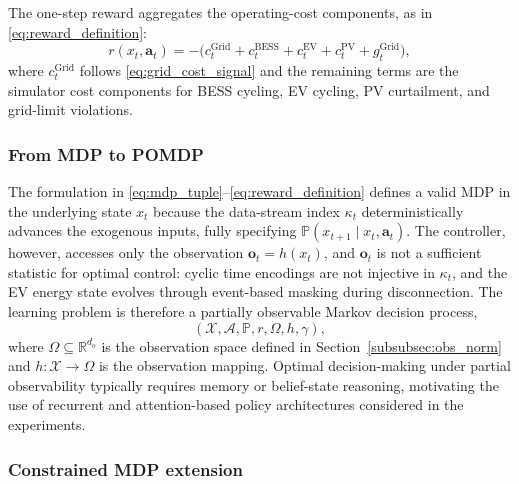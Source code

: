 \documentclass[preprint,12pt, 3p]{elsarticle}
\begin{document}
The one-step reward aggregates the operating-cost components, as in \eqref{eq:reward_definition}:
\begin{equation}
\label{eq:reward_definition}
r(x_t,\mathbf{a}_t)=
-\Big(
c^{\text{Grid}}_t
+c^{\text{BESS}}_t
+c^{\text{EV}}_t
+c^{\text{PV}}_t
+g^{\text{Grid}}_t
\Big),
\end{equation}
where $c^{\text{Grid}}_t$ follows \eqref{eq:grid_cost_signal} and the remaining terms are the simulator cost components for \gls{BESS} cycling, \gls{EV} cycling, \gls{PV} curtailment, and grid-limit violations.

\subsubsection{From MDP to POMDP}
\label{subsubsec:pomdp}

The formulation in \eqref{eq:mdp_tuple}--\eqref{eq:reward_definition} defines a valid \gls{MDP} in the underlying state $x_t$ because the data-stream index $\kappa_t$ deterministically advances the exogenous inputs, fully specifying $\mathbb{P}(x_{t+1}\mid x_t,\mathbf{a}_t)$. The controller, however, accesses only the observation $\mathbf{o}_t = h(x_t)$, and $\mathbf{o}_t$ is not a sufficient statistic for optimal control: cyclic time encodings are not injective in $\kappa_t$, and the \gls{EV} energy state evolves through event-based masking during disconnection. The learning problem is therefore a partially observable Markov decision process,
\begin{equation}
\label{eq:pomdp_tuple}
\left(\mathcal{X},\mathcal{A},\mathbb{P},r,\Omega,h,\gamma\right),
\end{equation}
where $\Omega \subseteq \mathbb{R}^{d_o}$ is the observation space defined in Section~\ref{subsubsec:obs_norm} and $h:\mathcal{X}\to\Omega$ is the observation mapping. Optimal decision-making under partial observability typically requires memory or belief-state reasoning, motivating the use of recurrent and attention-based policy architectures considered in the experiments.

\subsubsection{Constrained MDP extension}
\label{subsubsec:cmdp}
\end{document}

